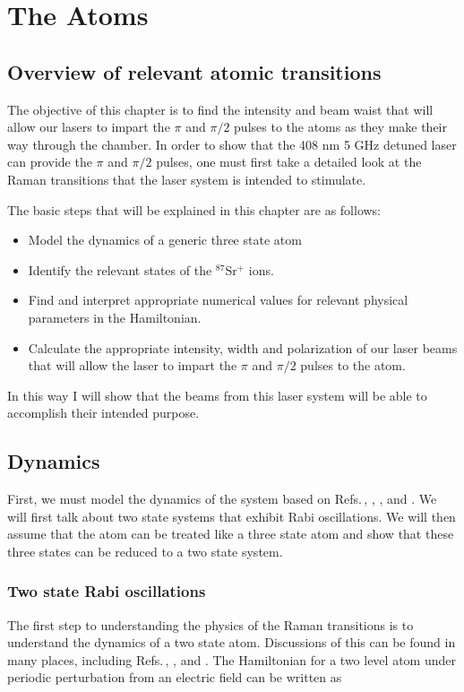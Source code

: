 \chapter{The Atoms} \label{ChapterAboutTheAtoms}
\section{Overview of relevant atomic transitions}

The objective of this chapter is to find the intensity and beam waist that will allow our lasers to impart the $\pi$ and $\pi/2$ pulses to the atoms as they make their way through the chamber. In order to show that the 408 nm 5 GHz detuned laser can provide the $\pi$ and $\pi/2$ pulses, one must first take a detailed look at the Raman transitions that the laser system is intended to stimulate.

The basic steps that will be explained in this chapter are as follows:
\begin{itemize}
\item Model the dynamics of a generic three state atom
\item Identify the relevant states of the $^{87}$Sr$^+$ ions.
\item Find and interpret appropriate numerical values for relevant physical parameters in the Hamiltonian.
\item Calculate the appropriate intensity, width and polarization of our laser beams that will allow the laser to impart the $\pi$ and $\pi/2$ pulses to the atom. 
\end{itemize}
In this way I will show that the beams from this laser system will be able to accomplish their intended purpose.

\section{Dynamics}\label{dynamicsSection}

First, we must model the dynamics of the system based on Refs.\,\cite{Young1997363}, \cite{gustavsonThesis}, \cite{footAtomicPhysics}, \cite{cjeDiss} and \cite{RamanBeamSplit}. 
We will first talk about two state systems that exhibit Rabi oscillations. We will then assume that the atom can be treated like a three state atom and show that these three states can be reduced to a two state system. 

\subsection{Two state Rabi oscillations}
\label{twoStateSection}
The first step to understanding the physics of the Raman transitions is to understand the dynamics of a two state atom. Discussions of this can be found in many places, including Refs.\,\cite{cohenTannoudji}, \cite{demilleBudkerKimball}, and \cite{Young1997363}. The Hamiltonian for a two level atom under periodic perturbation from an electric field can be written as 

